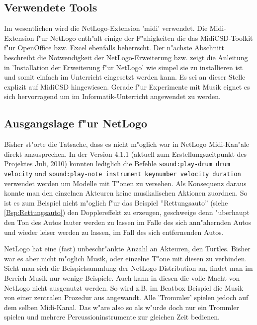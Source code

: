 \subsection{Verwendete Tools}
Im wesentlichen wird die NetLogo-Extension 'midi' verwendet. Die Midi-Extension
f"ur NetLogo enth"alt einige der F"ahigkeiten die das MidiCSD-Toolkit\cite{MidiCSD} f"ur 
OpenOffice bzw. Excel 
ebenfalls beherrscht. Der n"achste Abschnitt beschreibt die Notwendigkeit
der NetLogo-Erweiterung bzw. zeigt die Anleitung in 'Installation
der Erweiterung f"ur NetLogo' wie simpel sie zu installieren ist und
somit einfach im Unterricht eingesetzt werden kann. 
Es sei an dieser Stelle explizit auf MidiCSD hingewiesen. Gerade f"ur 
Experimente mit Musik eignet es sich hervorragend um im Informatik-Unterricht
angewendet zu werden. 

\subsection{Ausgangslage f"ur NetLogo}
\lstset{language=Logo}
Bisher st"orte die Tatsache, dass es nicht m"oglich war in NetLogo Midi-Kan"ale
direkt anzusprechen. In der Version 4.1.1 (aktuell zum Erstellungszeitpunkt des 
Projektes Juli, 2010) konnten lediglich die Befehle 
\lstinline|sound:play-drum drum velocity| und 
\lstinline|sound:play-note instrument keynumber velocity duration| verwendet
werden um Modelle mit T"onen zu versehen. %
Als Konsequenz daraus konnte man den einzelnen Akteuren keine musikalischen Aktionen 
zuordnen. So ist es zum Beispiel nicht m"oglich f"ur das Beispiel 
''Rettungsauto'' (siehe \ref{Bsp:Rettungsauto}) den Dopplereffekt zu erzeugen,
geschweige denn "uberhaupt den Ton des Autos lauter werden zu lassen im Falle
des sich ann"ahernden Autos und wieder leiser werden zu lassen, im Fall des sich
entfernenden Autos. 

NetLogo hat eine (fast) unbeschr"ankte Anzahl an Akteuren, den Turtles. Bisher
war es aber nicht m"oglich Musik, oder einzelne T"one mit diesen zu verbinden.
Sieht man sich die Beispielsammlung der NetLogo-Distribution an, findet man im
Bereich Musik nur wenige Beispiele. Auch kann in diesen die volle Macht von
NetLogo nicht ausgenutzt werden. So wird z.B. im Beatbox Beispiel die Musik
von einer zentralen Prozedur aus angewandt. Alle 'Trommler' spielen jedoch
auf dem selben Midi-Kanal. Das w"are also so als w"urde doch nur ein Trommler spielen
und mehrere Percussioninstrumente zur gleichen Zeit bedienen.

